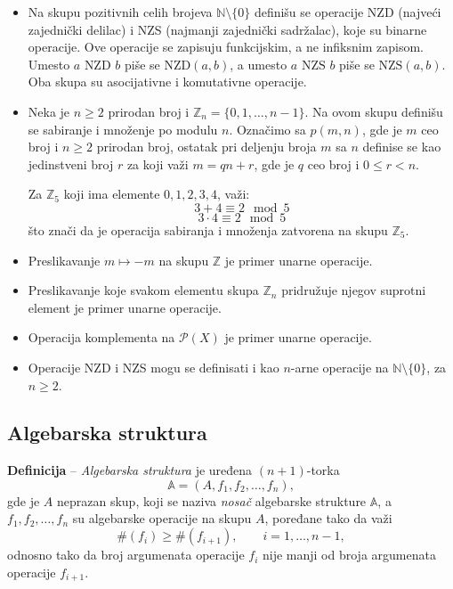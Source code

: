 \documentclass[a4paper,12pt]{article}
\begin{document}
\begin{itemize}
\begin{itemize}
\item Na skupu pozitivnih celih brojeva \(\mathbb{N}\setminus\{0\}\) definišu se
operacije NZD (najveći zajednički delilac) i NZS (najmanji zajednički sadržalac),
koje su binarne operacije. Ove operacije se zapisuju funkcijskim, a ne infiksnim zapisom.
Umesto \(a \text{ NZD } b\) piše se \(\text{NZD}(a,b)\), a umesto \(a \text{ NZS } b\)
piše se \(\text{NZS}(a,b)\). Oba skupa su asocijativne i komutativne operacije.

\item Neka je \(n \ge 2\) prirodan broj i \(\mathbb{Z}_n = \{0,1,\dots,n-1\}\).
Na ovom skupu definišu se sabiranje i množenje po modulu \(n\).
Označimo sa \( p(m, n) \), gde je \( m \) ceo broj i \( n \ge 2 \) prirodan broj, ostatak pri deljenju
broja \( m \) sa \( n \) definise se kao jedinstveni broj \( r \) za koji važi \( m = qn + r \), gde je \( q \) ceo broj i \( 0 \le r < n \).

Za \(\mathbb{Z}_5\) koji ima elemente \(0, 1, 2, 3, 4\), važi:
\[
  3 + 4 \equiv 2 \mod 5
\]
\[  3 \cdot 4 \equiv 2 \mod 5 \]
što znači da je operacija sabiranja i množenja zatvorena na skupu \(\mathbb{Z}_5\).

\item Preslikavanje \(m \mapsto -m\) na skupu \(\mathbb{Z}\) je primer unarne operacije.

\item Preslikavanje koje svakom elementu skupa \(\mathbb{Z}_n\) pridružuje njegov
suprotni element je primer unarne operacije.

\item Operacija komplementa na \(\mathcal{P}(X)\) je primer unarne operacije.

\item Operacije NZD i NZS mogu se definisati i kao \(n\)-arne operacije na
\(\mathbb{N}\setminus\{0\}\), za \(n \ge 2\).
\end{itemize}


\end{itemize}

\subsection{Algebarska struktura}

\textbf{Definicija} -- \emph{Algebarska struktura} je uređena $(n+1)$-torka
\[
\mathbb{A}=(A,f_1,f_2,\dots,f_n),
\]
gde je $A$ neprazan skup, koji se naziva \emph{nosač} algebarske strukture $\mathbb{A}$,
a $f_1,f_2,\dots,f_n$ su algebarske operacije na skupu $A$, poređane tako da važi
\[
\#(f_i)\ge \#(f_{i+1}), \qquad i=1,\dots,n-1,
\]
odnosno tako da broj argumenata operacije $f_i$ nije manji od broja argumenata
operacije $f_{i+1}$.
\end{document}
